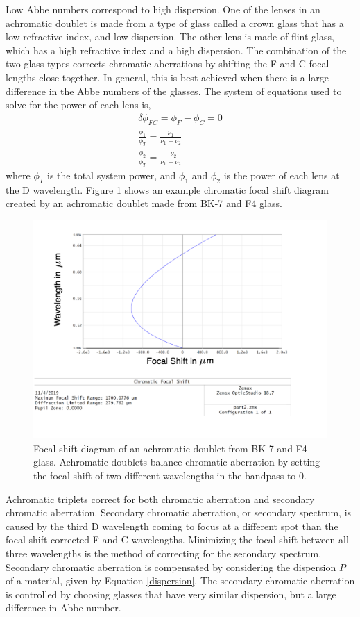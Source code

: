 Low Abbe numbers correspond to high dispersion. One of the lenses in an achromatic doublet is made from a type of glass called a crown glass that has a low refractive index, and low dispersion. The other lens is made of flint glass, which has a high refractive index and a high dispersion. The combination of the two glass types corrects chromatic aberrations by shifting the F and C focal lengths close together. In general, this is best achieved when there is a large difference in the Abbe numbers of the glasses. The system of equations used to solve for the power of each lens is,
%
\begin{eqnarray}
       \delta \phi_{FC}=\phi_F-\phi_C=0 \\
       \frac{\phi_{1}}{\phi_T}= \frac{\nu_1}{\nu_1-\nu_2} \\
       \frac{\phi_{2}}{\phi_T}= \frac{-\nu_2}{\nu_1-\nu_2}\nonumber
\end{eqnarray}
where $\phi_T$ is the total system power, and $\phi_1$ and $\phi_2$ is the power of each lens at the D wavelength. Figure \ref{fig:doublet} shows an example chromatic focal shift diagram created by an achromatic doublet made from BK-7 and F4 glass. 

\begin{figure}
    \centering
    \includegraphics[width=.8\textwidth]{Chapter Materials/Chapter Three Materials/doubletfocalshift.png}
    \caption{Focal shift diagram of an achromatic doublet from BK-7 and F4 glass. Achromatic doublets balance chromatic aberration by setting the focal shift of two different wavelengths in the bandpass to 0.}
    \label{fig:doublet}
\end{figure}

Achromatic triplets correct for both chromatic aberration and secondary chromatic aberration. Secondary chromatic aberration, or secondary spectrum, is caused by the third D wavelength coming to focus at a different spot than the focal shift corrected F and C wavelengths. Minimizing the focal shift between all three wavelengths is the method of correcting for the secondary spectrum. Secondary chromatic aberration is compensated by considering the dispersion $P$ of a material, given by Equation \ref{dispersion}. The secondary chromatic aberration is controlled by choosing glasses that have very similar dispersion, but a large difference in Abbe number. 

